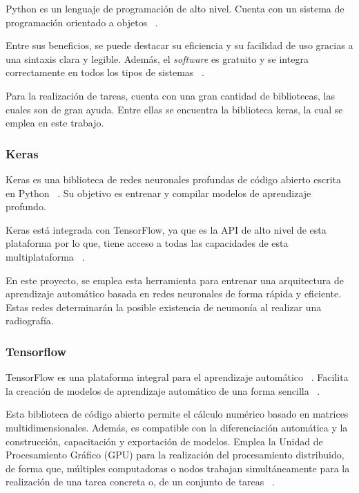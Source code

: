 Python es un lenguaje de programación de alto nivel. Cuenta con un sistema de programación orientado a objetos ~\cite{Pyth24}. 

Entre sus beneficios, se puede destacar su eficiencia y su facilidad de uso gracias a una sintaxis clara y legible. Además, el \textit{software} es gratuito y se integra correctamente en todos los tipos de sistemas ~\cite{aws24}.

Para la realización de tareas, cuenta con una gran cantidad de bibliotecas, las cuales son de gran ayuda. Entre ellas se encuentra la biblioteca keras, la cual se emplea en este trabajo.

\subsubsection{Keras}

Keras es una biblioteca de redes neuronales profundas de código abierto escrita en Python ~\cite{wikikeras24}. Su objetivo es entrenar y compilar modelos de aprendizaje profundo.

Keras está integrada con TensorFlow, ya que es la API de alto nivel de esta plataforma por lo que, tiene acceso a todas las capacidades de esta multiplataforma ~\cite{TenFloKeras24}.

En este proyecto, se emplea esta herramienta para entrenar una arquitectura de aprendizaje automático basada en redes neuronales de forma rápida y eficiente. Estas redes determinarán la posible existencia de neumonía al realizar una radiografía.

\subsubsection{Tensorflow}

TensorFlow es una plataforma integral para el aprendizaje automático ~\cite{TenFlobasic24}.  Facilita la creación de modelos de aprendizaje automático de una forma sencilla ~\cite{TenFloint24}.

Esta biblioteca de código abierto permite el cálculo numérico basado en matrices multidimensionales. Además, es compatible con la diferenciación automática y la construcción, capacitación y exportación de modelos. Emplea la Unidad de Procesamiento Gráfico (GPU) para la realización del procesamiento distribuido, de forma que, múltiples computadoras o nodos trabajan simultáneamente para la realización de una tarea concreta o, de un conjunto de tareas ~\cite{TenFlobasic24}.

